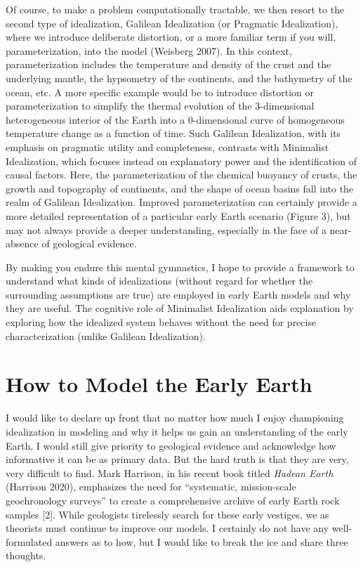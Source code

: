\documentclass[11pt]{article}
\begin{document}
Of course, to make a problem computationally tractable, we then resort to the second type of idealization, Galilean Idealization (or Pragmatic Idealization), where we introduce deliberate distortion, or a more familiar term if you will, parameterization, into the model (Weisberg 2007). In this context, parameterization includes the temperature and density of the crust and the underlying mantle, the hypsometry of the continents, and the bathymetry of the ocean, etc. A more specific example would be to introduce distortion or parameterization to simplify the thermal evolution of the 3-dimensional heterogeneous interior of the Earth into a 0-dimensional curve of homogeneous temperature change as a function of time. Such Galilean Idealization, with its emphasis on pragmatic utility and completeness, contrasts with Minimalist Idealization, which focuses instead on explanatory power and the identification of causal factors. Here, the parameterization of the chemical buoyancy of crusts, the growth and topography of continents, and the shape of ocean basins fall into the realm of Galilean Idealization. Improved parameterization can certainly provide a more detailed representation of a particular early Earth scenario (Figure 3), but may not always provide a deeper understanding, especially in the face of a near-absence of geological evidence.

By making you endure this mental gymnastics, I hope to provide a framework to understand what kinds of idealizations (without regard for whether the surrounding assumptions are true) are employed in early Earth models and why they are useful. The cognitive role of Minimalist Idealization aids explanation by exploring how the idealized system behaves without the need for precise characterization (unlike Galilean Idealization).

\section*{How to Model the Early Earth}

I would like to declare up front that no matter how much I enjoy championing idealization in modeling and why it helps us gain an understanding of the early Earth, I would still give priority to geological evidence and acknowledge how informative it can be as primary data. But the hard truth is that they are very, very difficult to find. Mark Harrison, in his recent book titled \emph{Hadean Earth} (Harrison 2020), emphasizes the need for ``systematic, mission-scale geochronology surveys'' to create a comprehensive archive of early Earth rock samples [2]. While geologists tirelessly search for these early vestiges, we as theorists must continue to improve our models. I certainly do not have any well-formulated answers as to how, but I would like to break the ice and share three thoughts.
\end{document}

